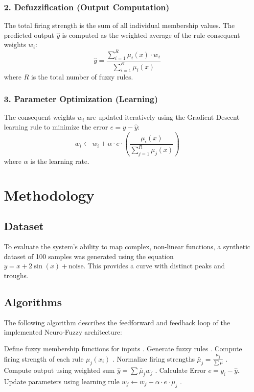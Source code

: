 \documentclass[11pt]{article}
\begin{document}
\subsubsection*{2. Defuzzification (Output Computation)}
The total firing strength is the sum of all individual membership values. The predicted output $\hat{y}$ is computed as the weighted average of the rule consequent weights $w_i$:
\begin{equation}
    \hat{y} = \frac{\sum_{i=1}^{R} \mu_i(x) \cdot w_i}{\sum_{i=1}^{R} \mu_i(x)}
\end{equation}
where $R$ is the total number of fuzzy rules.

\subsubsection*{3. Parameter Optimization (Learning)}
The consequent weights $w_i$ are updated iteratively using the Gradient Descent learning rule to minimize the error $e = y - \hat{y}$:
\begin{equation}
    w_i \gets w_i + \alpha \cdot e \cdot \left( \frac{\mu_i(x)}{\sum_{j=1}^{R} \mu_j(x)} \right)
\end{equation}
where $\alpha$ is the learning rate.

\section{Methodology}

\subsection{Dataset}
To evaluate the system's ability to map complex, non-linear functions, a synthetic dataset of 100 samples was generated using the equation $y = x + 2\sin(x) + \text{noise}$. This provides a curve with distinct peaks and troughs.

\subsection{Algorithms}
The following algorithm describes the feedforward and feedback loop of the implemented Neuro-Fuzzy architecture:

\begin{algorithm}[H]
    \caption{Neuro-Fuzzy Algorithm}
    \begin{algorithmic}[1]
        \State Define fuzzy membership functions for inputs \cite{jang1997neuro}.
        \State Generate fuzzy rules \cite{jang1997neuro}.
        \State Compute firing strength of each rule $\mu_j(x_i)$ \cite{jang1997neuro}.
        \State Normalize firing strengths $\bar{\mu}_j = \frac{\mu_j}{\sum \mu}$ \cite{jang1997neuro}.
        \State Compute output using weighted sum $\hat{y} = \sum \bar{\mu}_j w_j$ \cite{jang1997neuro}.
        \State Calculate Error $e = y_i - \hat{y}$.
        \State Update parameters using learning rule $w_j \gets w_j + \alpha \cdot e \cdot \bar{\mu}_j$ \cite{jang1997neuro}.
        \EndFor
        \EndFor
    \end{algorithmic}
\end{algorithm}
\end{document}
